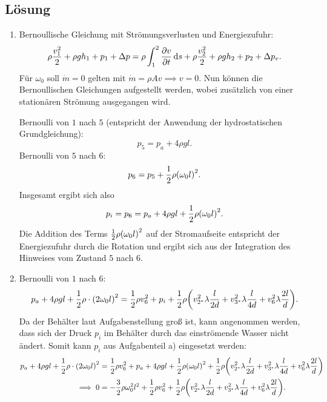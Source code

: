 \documentclass{exercise}
\begin{document}
    \subsection*{Lösung}
    \begin{enumerate}
        \item Bernoullische Gleichung mit Strömungsverlusten und Energiezufuhr:
        \[
            \rho\frac{v_1^2}{2} + \rho gh_1 + p_1 + \Delta p = \rho\int_1^2 \frac{\partial v}{\partial t}\mathop{\mathrm{d}\!} s + \rho\frac{v_2^2}{2} + \rho gh_2 + p_2 + \Delta p_v.
        \]
        Für \(\omega_0\) soll \(\dot{m} = 0\) gelten mit \(\dot{m} = \rho Av \implies v = 0\).
        Nun können die Bernoullischen Gleichungen aufgestellt werden, wobei zusätzlich von einer stationären Strömung ausgegangen wird.
        
        Bernoulli von \(1\) nach \(5\) (entspricht der Anwendung der hydrostatischen Grundgleichung):
        \[
            p_5 = p_a + 4\rho gl.
        \]
        Bernoulli von \(5\) nach \(6\):
        \[
            p_6 = p_5 + \frac{1}{2}\rho\parentheses*{\omega_0 l}^2.
        \]
        Insgesamt ergibt sich also
        \[
            p_i = p_6 = p_a + 4\rho gl + \frac{1}{2}\rho\parentheses*{\omega_0 l}^2.
        \]
        Die Addition des Terms \(\frac{1}{2}\rho\parentheses*{\omega_0 l}^2\) auf der Stromaufseite entspricht der Energiezufuhr durch die Rotation und ergibt sich aus der Integration des Hinweises vom Zustand \(5\) nach \(6\).
        \item Bernoulli von \(1\) nach \(6\):
        \[
            p_a + 4\rho gl + \frac{1}{2}\rho \cdot \parentheses*{2\omega_0 l}^2 = \frac{1}{2}\rho v_6^2 + p_i + \frac{1}{2}\rho\parentheses*{v_{2^*}^2 \lambda\frac{l}{2d} + v_{3^*}^2 \lambda\frac{l}{4d} + v_6^2 \lambda\frac{2l}{d}}.
        \]
        Da der Behälter laut Aufgabenstellung groß ist, kann angenommen werden, dass sich der Druck \(p_i\) im Behälter durch das einströmende Wasser nicht ändert.
        Somit kann \(p_i\) aus Aufgabenteil a) eingesetzt werden:
        \begin{align*}
            p_a + 4\rho gl + \frac{1}{2}\rho \cdot \parentheses*{2\omega_0 l}^2 &= \frac{1}{2}\rho v_6^2 + p_a + 4\rho gl + \frac{1}{2}\rho\parentheses*{\omega_0 l}^2 + \frac{1}{2}\rho\parentheses*{v_{2^*}^2 \lambda\frac{l}{2d} + v_{3^*}^2 \lambda\frac{l}{4d} + v_6^2 \lambda\frac{2l}{d}}\\
            \implies 0 &= -\frac{3}{2}\rho\omega_0^2 l^2 + \frac{1}{2}\rho v_6^2 + \frac{1}{2}\rho\parentheses*{v_{2^*}^2 \lambda\frac{l}{2d} + v_{3^*}^2 \lambda\frac{l}{4d} + v_6^2 \lambda\frac{2l}{d}}.

\end{align*}
\end{enumerate}
\end{document}
